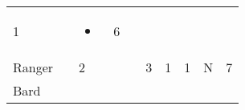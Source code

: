 \documentclass[12pt]{article}
\newcommand{\indexClass}[1]{\index{#1}}
\newcommand{\class}[1]{#1\indexClass{#1}}
\begin{document}
\begin{longtable}[]{@{}llllllllll@{}}
\begin{minipage}[t]{0.06\columnwidth}\raggedright\strut
1
\strut\end{minipage} &
\begin{minipage}[t]{0.06\columnwidth}\raggedright\strut
\strut\end{minipage} &
\begin{minipage}[t]{0.07\columnwidth}\raggedright\strut
\begin{itemize}
\item
\end{itemize}
\strut\end{minipage} &
\begin{minipage}[t]{0.08\columnwidth}\raggedright\strut
6
\strut\end{minipage}\tabularnewline
\begin{minipage}[t]{0.13\columnwidth}\raggedright\strut
\class{Ranger}
\strut\end{minipage} &
\begin{minipage}[t]{0.06\columnwidth}\raggedright\strut
\strut\end{minipage} &
\begin{minipage}[t]{0.06\columnwidth}\raggedright\strut
2
\strut\end{minipage} &
\begin{minipage}[t]{0.06\columnwidth}\raggedright\strut
\strut\end{minipage} &
\begin{minipage}[t]{0.06\columnwidth}\raggedright\strut
\strut\end{minipage} &
\begin{minipage}[t]{0.06\columnwidth}\raggedright\strut
3
\strut\end{minipage} &
\begin{minipage}[t]{0.06\columnwidth}\raggedright\strut
1
\strut\end{minipage} &
\begin{minipage}[t]{0.06\columnwidth}\raggedright\strut
1
\strut\end{minipage} &
\begin{minipage}[t]{0.07\columnwidth}\raggedright\strut
N
\strut\end{minipage} &
\begin{minipage}[t]{0.08\columnwidth}\raggedright\strut
7
\strut\end{minipage}\tabularnewline
\begin{minipage}[t]{0.13\columnwidth}\raggedright\strut
\class{Bard}
\strut\end{minipage} &

\end{longtable}
\end{document}
